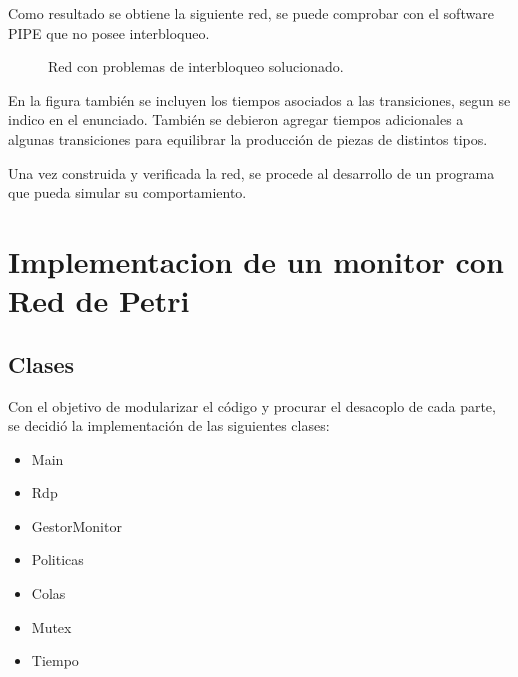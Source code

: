 \documentclass[10pt, a4paper,notitlepage]{article}
\begin{document}
Como resultado se obtiene la siguiente red, se puede comprobar con el software PIPE que no posee interbloqueo.

\begin{figure}[H] %
	\caption{Red con problemas de interbloqueo solucionado.}
	\label{fig:red}
\end{figure}


En la figura también se incluyen los tiempos asociados a las transiciones, segun se indico en el enunciado. También se debieron agregar tiempos adicionales a algunas transiciones para equilibrar la producción de piezas de distintos tipos.

Una vez construida y verificada la red, se procede al desarrollo de un programa que pueda simular su comportamiento.



\section{Implementacion de un monitor con Red de Petri}
\subsection{Clases}
Con el objetivo de modularizar el código y procurar el desacoplo de cada parte, se decidió la implementación de las siguientes clases:

\begin{itemize}
	\item Main
	\item Rdp
	\item GestorMonitor
	\item Politicas
	\item Colas
	\item Mutex
	\item Tiempo
\end{itemize}
\end{document}
